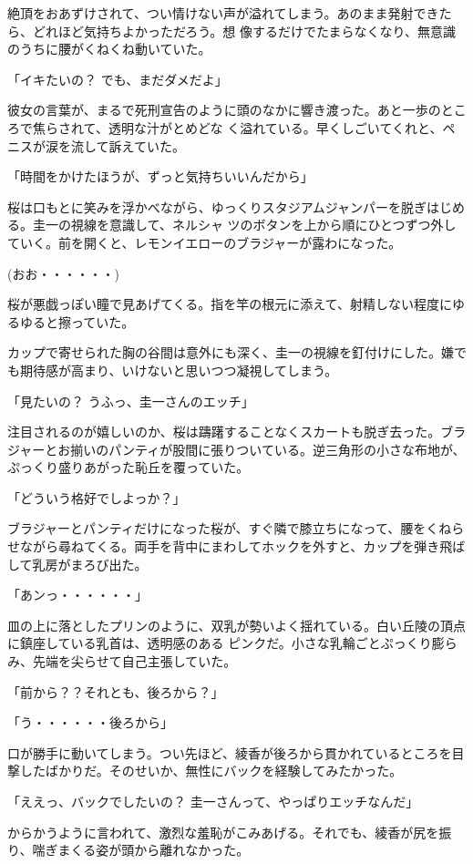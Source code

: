 ﻿\documentclass[book,tate]{jlreq}
\begin{document}
絶頂をおあずけされて、つい情けない声が溢れてしまう。あのまま発射できたら、どれほど気持ちよかっただろう。想 像するだけでたまらなくなり、無意識のうちに腰がくねくね動いていた。

「イキたいの？ でも、まだダメだよ」

彼女の言葉が、まるで死刑宣告のように頭のなかに響き渡った。あと一歩のところで焦らされて、透明な汁がとめどな く溢れている。早くしごいてくれと、ペニスが涙を流して訴えていた。

「時間をかけたほうが、ずっと気持ちいいんだから」

桜は口もとに笑みを浮かべながら、ゆっくりスタジアムジャンパーを脱ぎはじめる。圭一の視線を意識して、ネルシャ ツのボタンを上から順にひとつずつ外していく。前を開くと、レモンイエローのブラジャーが露わになった。

(おお・・・・・・)

桜が悪戯っぽい瞳で見あげてくる。指を竿の根元に添えて、射精しない程度にゆるゆると擦っていた。

カップで寄せられた胸の谷間は意外にも深く、圭一の視線を釘付けにした。嫌でも期待感が高まり、いけないと思いつつ凝視してしまう。

「見たいの？ うふっ、圭一さんのエッチ」

注目されるのが嬉しいのか、桜は躊躇することなくスカートも脱ぎ去った。ブラジャーとお揃いのパンティが股間に張りついている。逆三角形の小さな布地が、ぷっくり盛りあがった恥丘を覆っていた。

「どういう格好でしよっか？」

ブラジャーとパンティだけになった桜が、すぐ隣で膝立ちになって、腰をくねらせながら尋ねてくる。両手を背中にまわしてホックを外すと、カップを弾き飛ばして乳房がまろび出た。

「あンっ・・・・・・」

皿の上に落としたプリンのように、双乳が勢いよく揺れている。白い丘陵の頂点に鎮座している乳首は、透明感のある ピンクだ。小さな乳輪ごとぷっくり膨らみ、先端を尖らせて自己主張していた。

「前から？？それとも、後ろから？」

「う・・・・・・後ろから」

口が勝手に動いてしまう。つい先ほど、綾香が後ろから貫かれているところを目撃したばかりだ。そのせいか、無性にバックを経験してみたかった。

「ええっ、バックでしたいの？ 圭一さんって、やっぱりエッチなんだ」

からかうように言われて、激烈な羞恥がこみあげる。それでも、綾香が尻を振り、喘ぎまくる姿が頭から離れなかった。
\end{document}
